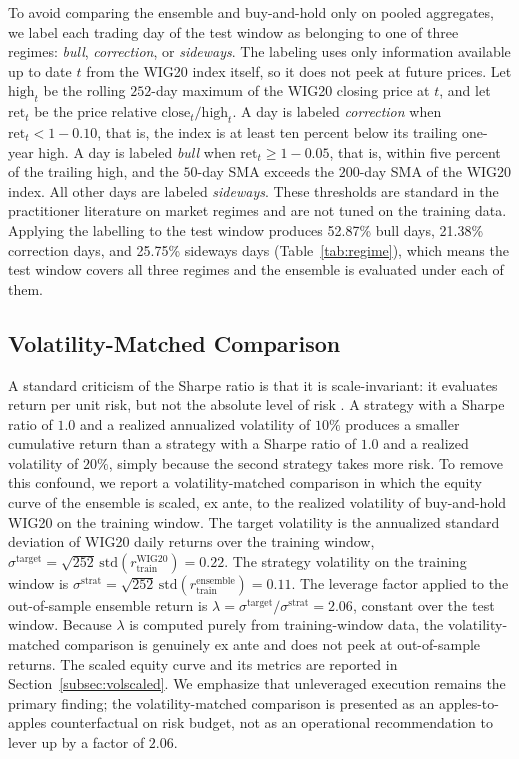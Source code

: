 \documentclass{ieeeaccess}
\newcommand{\Leverage}{\ensuremath{2.06}}
\newcommand{\StrategyTrainVol}{\ensuremath{0.11}}
\newcommand{\BHOosVol}{\ensuremath{0.22}}
\newcommand{\RegBullShare}{52.87\%}
\newcommand{\RegCorrectionShare}{21.38\%}
\newcommand{\RegSidewaysShare}{25.75\%}
\begin{document}
To avoid comparing the ensemble and buy-and-hold only on pooled aggregates, we label each trading day of the test window as belonging to one of three regimes: \emph{bull}, \emph{correction}, or \emph{sideways}. The labeling uses only information available up to date $t$ from the WIG20 index itself, so it does not peek at future prices. Let $\mathrm{high}_t$ be the rolling $252$-day maximum of the WIG20 closing price at $t$, and let $\mathrm{ret}_t$ be the price relative $\mathrm{close}_t / \mathrm{high}_t$. A day is labeled \emph{correction} when $\mathrm{ret}_t < 1 - 0.10$, that is, the index is at least ten percent below its trailing one-year high. A day is labeled \emph{bull} when $\mathrm{ret}_t \geq 1 - 0.05$, that is, within five percent of the trailing high, and the $50$-day SMA exceeds the $200$-day SMA of the WIG20 index. All other days are labeled \emph{sideways}. These thresholds are standard in the practitioner literature on market regimes and are not tuned on the training data. Applying the labelling to the test window produces \RegBullShare{} bull days, \RegCorrectionShare{} correction days, and \RegSidewaysShare{} sideways days (Table~\ref{tab:regime}), which means the test window covers all three regimes and the ensemble is evaluated under each of them.

\subsection{Volatility-Matched Comparison}
\label{subsec:volmatch}

A standard criticism of the Sharpe ratio is that it is scale-invariant: it evaluates return per unit risk, but not the absolute level of risk \cite{harvey2016}. A strategy with a Sharpe ratio of $1.0$ and a realized annualized volatility of $10\%$ produces a smaller cumulative return than a strategy with a Sharpe ratio of $1.0$ and a realized volatility of $20\%$, simply because the second strategy takes more risk. To remove this confound, we report a volatility-matched comparison in which the equity curve of the ensemble is scaled, ex ante, to the realized volatility of buy-and-hold WIG20 on the training window. The target volatility is the annualized standard deviation of WIG20 daily returns over the training window, $\sigma^{\text{target}} = \sqrt{252}\, \mathrm{std}(r^{\text{WIG20}}_\text{train}) = \BHOosVol{}$. The strategy volatility on the training window is $\sigma^{\text{strat}} = \sqrt{252}\,\mathrm{std}(r^{\text{ensemble}}_\text{train}) = \StrategyTrainVol{}$. The leverage factor applied to the out-of-sample ensemble return is $\lambda = \sigma^{\text{target}} / \sigma^{\text{strat}} = \Leverage{}$, constant over the test window. Because $\lambda$ is computed purely from training-window data, the volatility-matched comparison is genuinely ex ante and does not peek at out-of-sample returns. The scaled equity curve and its metrics are reported in Section~\ref{subsec:volscaled}. We emphasize that unleveraged execution remains the primary finding; the volatility-matched comparison is presented as an apples-to-apples counterfactual on risk budget, not as an operational recommendation to lever up by a factor of $\Leverage{}$.
\end{document}
